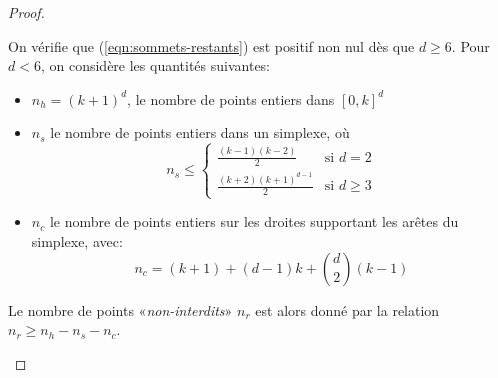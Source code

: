 \documentclass[11pt]{article}
\begin{document}
\begin{proof}
\begin{description}
      On vérifie que (\ref{eqn:sommets-restants}) est positif non nul dès que $d\geq{6}$. Pour $d<6$, on considère les quantités suivantes:
      \begin{itemize}
        \item $n_h = (k+1)^d$, le nombre de points entiers dans $[0,k]^d$
        \item $n_s$ le nombre de points entiers dans un simplexe, où
        $$
          n_s \leq \left\{
            \begin{array}{rl}
              \frac{(k-1)(k-2)}{2} & \mbox{si } d=2 \\
              \frac{(k+2)(k+1)^{d-1}}{2} & \mbox{si } d\geq{3}
            \end{array}
        $$
        \item $n_c$ le nombre de points entiers sur les droites supportant les arêtes du simplexe, avec:
        $$
          n_c = (k+1) + (d-1)k + {d\choose2}(k-1)
        $$
      \end{itemize}
      Le nombre de points «\textit{non-interdits}» $n_r$ est alors donné par la relation $n_r\geq{n_h - n_s - n_c}$.

    \end{description}









\end{proof}
\end{document}
